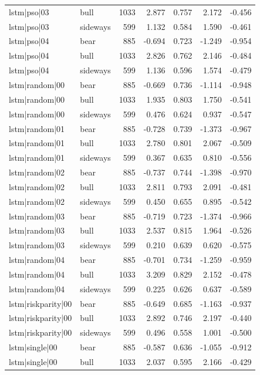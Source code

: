 \begin{table}
\begin{tabular}{llrrrrr}
lstm|pso|03 & bull & 1033 & 2.877 & 0.757 & 2.172 & -0.456 \\
lstm|pso|03 & sideways & 599 & 1.132 & 0.584 & 1.590 & -0.461 \\
lstm|pso|04 & bear & 885 & -0.694 & 0.723 & -1.249 & -0.954 \\
lstm|pso|04 & bull & 1033 & 2.826 & 0.762 & 2.146 & -0.484 \\
lstm|pso|04 & sideways & 599 & 1.136 & 0.596 & 1.574 & -0.479 \\
lstm|random|00 & bear & 885 & -0.669 & 0.736 & -1.114 & -0.948 \\
lstm|random|00 & bull & 1033 & 1.935 & 0.803 & 1.750 & -0.541 \\
lstm|random|00 & sideways & 599 & 0.476 & 0.624 & 0.937 & -0.547 \\
lstm|random|01 & bear & 885 & -0.728 & 0.739 & -1.373 & -0.967 \\
lstm|random|01 & bull & 1033 & 2.780 & 0.801 & 2.067 & -0.509 \\
lstm|random|01 & sideways & 599 & 0.367 & 0.635 & 0.810 & -0.556 \\
lstm|random|02 & bear & 885 & -0.737 & 0.744 & -1.398 & -0.970 \\
lstm|random|02 & bull & 1033 & 2.811 & 0.793 & 2.091 & -0.481 \\
lstm|random|02 & sideways & 599 & 0.450 & 0.655 & 0.895 & -0.542 \\
lstm|random|03 & bear & 885 & -0.719 & 0.723 & -1.374 & -0.966 \\
lstm|random|03 & bull & 1033 & 2.537 & 0.815 & 1.964 & -0.526 \\
lstm|random|03 & sideways & 599 & 0.210 & 0.639 & 0.620 & -0.575 \\
lstm|random|04 & bear & 885 & -0.701 & 0.734 & -1.259 & -0.959 \\
lstm|random|04 & bull & 1033 & 3.209 & 0.829 & 2.152 & -0.478 \\
lstm|random|04 & sideways & 599 & 0.225 & 0.626 & 0.637 & -0.589 \\
lstm|riskparity|00 & bear & 885 & -0.649 & 0.685 & -1.163 & -0.937 \\
lstm|riskparity|00 & bull & 1033 & 2.892 & 0.746 & 2.197 & -0.440 \\
lstm|riskparity|00 & sideways & 599 & 0.496 & 0.558 & 1.001 & -0.500 \\
lstm|single|00 & bear & 885 & -0.587 & 0.636 & -1.055 & -0.912 \\
lstm|single|00 & bull & 1033 & 2.037 & 0.595 & 2.166 & -0.429 \\

\end{tabular}
\end{table}
